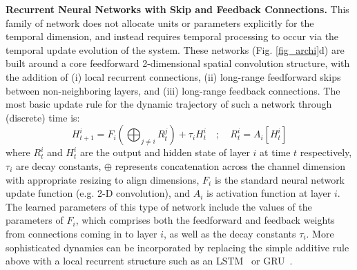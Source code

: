 \textbf{Recurrent Neural Networks with Skip and Feedback Connections.} This family of network does not allocate units or parameters explicitly for the temporal dimension, and instead requires temporal processing to occur via the temporal update evolution of the system.  These networks (Fig. \ref{fig_archi}d) are built around a core feedforward 2-dimensional spatial convolution structure, with the addition of (i) local recurrent connections, (ii) long-range feedforward skips between non-neighboring layers, and (iii) long-range feedback connections.  
The most basic update rule for the dynamic trajectory of such a network through (discrete) time is: 
$$H^i_{t+1} = F_i \left ( \bigoplus_{j \neq i} R^j_t \right )  + \tau_i H^i_t \quad ;\quad R^i_t = A_i[H^i_t]$$
where $R^i_t$ and $H^i_t$ are the output and hidden state of layer $i$ at time $t$ respectively,  $\tau_i$  are decay constants, $\oplus$ represents concatenation across the channel dimension with appropriate resizing to align dimensions, $F_i$ is the standard neural network update function (e.g. 2-D convolution), and $A_i$ is activation function at layer $i$.  
The learned parameters of this type of network include the values of the parameters of $F_i$, which comprises both the feedforward and feedback weights from connections coming in to layer $i$, as well as the decay constants $\tau_i$. 
More sophisticated dynamics can be incorporated by replacing the simple additive rule above with a local recurrent structure such as an LSTM~\cite{} or GRU~\cite{}.


